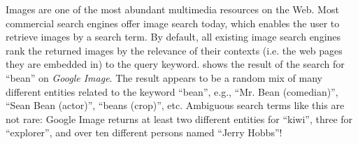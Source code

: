 %
%
%

%
Images are one of the most abundant multimedia resources on the Web.
Most commercial search engines offer image search today,
which enables the user to retrieve images by a search term.
By default, all existing image search engines rank the returned images
by the relevance of their contexts (i.e. the web pages they are
embedded in) to the query keyword. 
shows the result of the search for ``bean'' on
\textit{Google Image}\cite{google}.
The result appears to be a random mix of many different entities related
to the keyword ``bean'', e.g.,
``Mr. Bean (comedian)'', ``Sean Bean (actor)'',
``beans (crop)'', etc. Ambiguous search terms like this
are not rare: Google Image returns at least two different entities for
``kiwi'', three for ``explorer'', %
and over ten different persons named ``Jerry Hobbs''!

